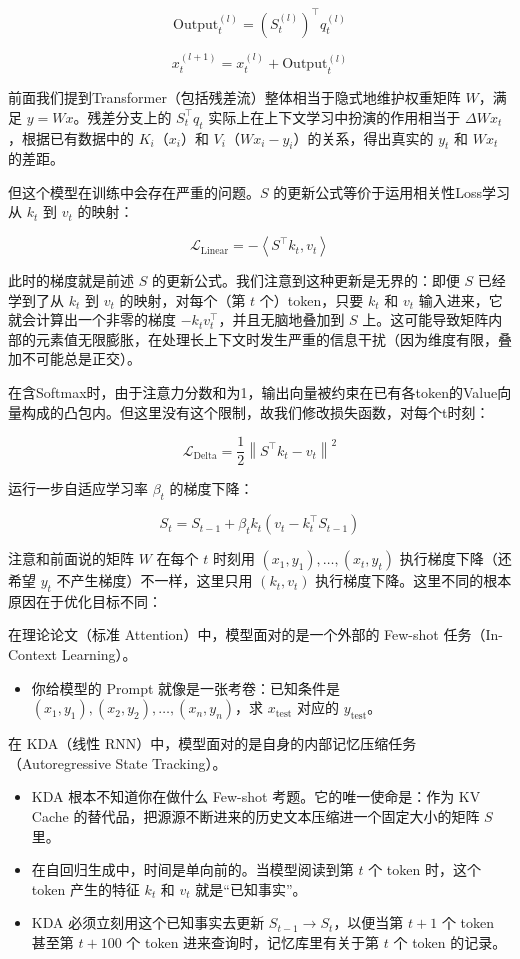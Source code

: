 \[
\mathrm{Output}_t^{(l)}=\left(S_t^{(l)}\right)^\top q_t^{(l)}
\]

\[
x_t^{(l+1)}=x_t^{(l)}+\mathrm{Output}_t^{(l)}
\]

前面我们提到Transformer（包括残差流）整体相当于隐式地维护权重矩阵 \(W\)，满足 \(y=Wx\)。残差分支上的 \(S_t^\top q_t\) 实际上在上下文学习中扮演的作用相当于 \(\Delta W x_t\)，根据已有数据中的 \(K_i\)（\(x_i\)）和 \(V_i\)（\(Wx_i-y_i\)）的关系，得出真实的 \(y_t\) 和 \(Wx_t\) 的差距。

但这个模型在训练中会存在严重的问题。\(S\) 的更新公式等价于运用相关性Loss学习从 \(k_t\) 到 \(v_t\) 的映射：

\[
\mathcal{L}_{\mathrm{Linear}}=-\left\langle S^\top k_t,v_t\right\rangle
\]

此时的梯度就是前述 \(S\) 的更新公式。我们注意到这种更新是无界的：即便 \(S\) 已经学到了从 \(k_t\) 到 \(v_t\) 的映射，对每个（第 \(t\) 个）token，只要 \(k_t\) 和 \(v_t\) 输入进来，它就会计算出一个非零的梯度 \(-k_tv_t^\top\)，并且无脑地叠加到 \(S\) 上。这可能导致矩阵内部的元素值无限膨胀，在处理长上下文时发生严重的信息干扰（因为维度有限，叠加不可能总是正交）。

在含Softmax时，由于注意力分数和为1，输出向量被约束在已有各token的Value向量构成的凸包内。但这里没有这个限制，故我们修改损失函数，对每个t时刻：

\[
\mathcal{L}_{\mathrm{Delta}}=\frac{1}{2}\left\lVert S^\top k_t-v_t\right\rVert^2
\]

运行一步自适应学习率 \(\beta_t\) 的梯度下降：

\[
S_t=S_{t-1}+\beta_tk_t\left(v_t-k_t^\top S_{t-1}\right)
\]

注意和前面说的矩阵 \(W\) 在每个 \(t\) 时刻用 \((x_1,y_1),\ldots,(x_t,y_t)\) 执行梯度下降（还希望 \(y_t\) 不产生梯度）不一样，这里只用 \((k_t,v_t)\) 执行梯度下降。这里不同的根本原因在于优化目标不同：

在理论论文（标准 Attention）中，模型面对的是一个外部的 Few-shot 任务（In-Context Learning）。

\begin{itemize}
\tightlist
\item
  你给模型的 Prompt 就像是一张考卷：已知条件是 \((x_1,y_1),(x_2,y_2),\ldots,(x_n,y_n)\)，求 \(x_{\mathrm{test}}\) 对应的 \(y_{\mathrm{test}}\)。
\end{itemize}

在 KDA（线性 RNN）中，模型面对的是自身的内部记忆压缩任务（Autoregressive State Tracking）。

\begin{itemize}
\tightlist
\item
  KDA 根本不知道你在做什么 Few-shot 考题。它的唯一使命是：作为 KV Cache 的替代品，把源源不断进来的历史文本压缩进一个固定大小的矩阵 \(S\) 里。
\item
  在自回归生成中，时间是单向前的。当模型阅读到第 \(t\) 个 token 时，这个 token 产生的特征 \(k_t\) 和 \(v_t\) 就是``已知事实''。
\item
  KDA 必须立刻用这个已知事实去更新 \(S_{t-1}\to S_t\)，以便当第 \(t+1\) 个 token 甚至第 \(t+100\) 个 token 进来查询时，记忆库里有关于第 \(t\) 个 token 的记录。
\end{itemize}

